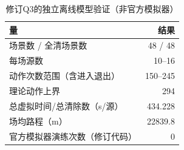 \begin{table}[htbp]
\centering
\caption{修订Q3的独立离线模型验证（非官方模拟器）}\label{tab:q3offline}
\begin{tabular}{lr}\toprule
量 & 结果\\\midrule
场景数 / 全清场景数 & 48 / 48\\
每场源数 & 10--16\\
动作次数范围（含进入退出） & 150--245\\
理论动作上界 & 294\\
总虚拟时间/总清除数（s/源） & 434.228\\
场均路程（m） & 22839.8\\
官方模拟器演练次数（修订代码） & 0\\\bottomrule
\end{tabular}
\end{table}
